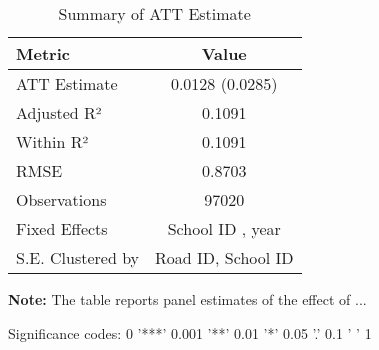 \begin{table}[H]
\centering
\caption{Summary of ATT Estimate}
\label{tab:SA_reading_10p}
 \begin{center}
 \begin{tabular}{lc}
 \toprule
Metric & Value \\
\midrule
ATT Estimate & 0.0128 (0.0285) \\
\hline 
 Adjusted R² & 0.1091 \\
Within R² & 0.1091 \\
RMSE & 0.8703 \\
Observations & 97020 \\
\hline 
 Fixed Effects & School ID ,  year \\
S.E. Clustered by & Road ID, School ID \\
\bottomrule
\end{tabular}
 \end{center}\begin{tablenotes}
\small
\item \textbf{Note:} The table reports panel estimates of the effect of ...
\item Significance codes: 0 '***' 0.001 '**' 0.01 '*' 0.05 '.' 0.1 ' ' 1
\end{tablenotes}
\end{table}